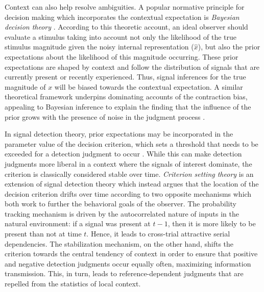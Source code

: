 \documentclass[a4paper, nobind]{templates/ociamthesis}
\begin{document}
Context can also help resolve ambiguities. A popular normative principle for decision making which incorporates the contextual expectation is \emph{Bayesian decision theory} \autocite{mamassian2002,yuille2006}. According to this theoretic account, an ideal observer should evaluate a stimulus taking into account not only the likelihood of the true stimulus magnitude given the noisy internal representation (\(\hat{x}\)), but also the prior expectations about the likelihood of this magnitude occurring. These prior expectations are shaped by context and follow the distribution of signals that are currently present or recently experienced. Thus, signal inferences for the true magnitude of \({x}\) will be biased towards the contextual expectation. A similar theoretical framework underpins dominating accounts of the contraction bias, appealing to Bayesian inference to explain the finding that the influence of the prior grows with the presence of noise in the judgment process \autocite{ashourian2011,olkkonen2014}.

In signal detection theory, prior expectations may be incorporated in the parameter value of the decision criterion, which sets a threshold that needs to be exceeded for a detection judgment to occur \autocite{green1966}. While this can make detection judgments more liberal in a context where the signals of interest dominate, the criterion is classically considered stable over time. \emph{Criterion setting theory} \autocite{treisman1984,lages2010} is an extension of signal detection theory which instead argues that the location of the decision criterion drifts over time according to two opposite mechanisms which both work to further the behavioral goals of the observer. The probability tracking mechanism is driven by the autocorrelated nature of inputs in the natural environment: if a signal was present at \(t-1\), then it is more likely to be present than not at time \(t\). Hence, it leads to cross-trial attractive serial dependencies. The stabilization mechanism, on the other hand, shifts the criterion towards the central tendency of context in order to ensure that positive and negative detection judgments occur equally often, maximizing information transmission. This, in turn, leads to reference-dependent judgments that are repelled from the statistics of local context.
\end{document}
